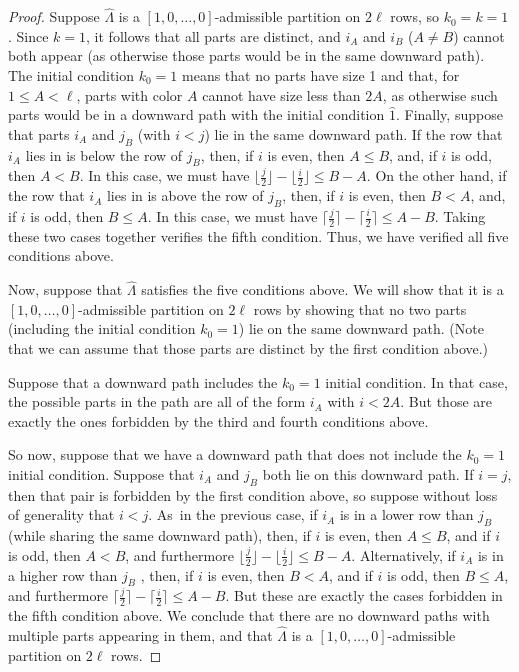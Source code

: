 \documentclass[pdftex]{sigma}
\numberwithin{equation}{section}
\theoremstyle{definition}
\newcommand{\ficone}{{\widehat{1}}}
\newcommand{\LH}{{\widehat{\Lambda}}}
\begin{document}
\begin{proof}
Suppose $\LH$ is a $[1,0,\dots,0]$-admissible partition on $2\ell$ rows, so $k_0=k=1$. Since $k=1$, it follows that all parts are distinct, and $i_A$ and $i_B$ ($A\ne B$) cannot both appear (as otherwise those parts would be in the same downward path). The initial condition $k_0=1$ means that no parts have size 1 and that, for $1\le A < \ell$, parts with color $A$ cannot have size less than $2A$, as otherwise such parts would be in a downward path with the initial condition $\ficone$.
Finally, suppose that parts $i_A$ and $j_B$ (with $i<j$) lie in the same downward path. If the row that $i_A$ lies in is below the row of $j_B$, then, if $i$ is even, then $A \le B$, and, if $i$ is odd, then $A < B$. In this case, we must have $ \bigl\lfloor\frac j2\bigr\rfloor-\bigl\lfloor\frac i2\bigl\rfloor\le B-A$. On the other hand, if the row that $i_A$ lies in is above the row of $j_B$, then, if $i$ is even, then $B<A$, and, if $i$ is odd, then $B \le A$. In this case, we must have $ \bigl\lceil\frac j2\bigr\rceil-\bigl\lceil\frac i2\bigr\rceil\le A-B$. Taking these two cases together verifies the fifth condition. Thus, we have verified all five conditions above.

Now, suppose that $\LH$ satisfies the five conditions above. We will show that it is a $[1,0,\dots,0]$-admissible partition on $2\ell$ rows by showing that no two parts (including the initial condition $k_0=1$) lie on the same downward path. (Note that we can assume that those parts are distinct by the first condition above.)

Suppose that a downward path includes the $k_0=1$ initial condition. In that case, the possible parts in the path are all of the form $i_A$ with $i< 2A$. But those are exactly the ones forbidden by the third and fourth conditions above.

So now, suppose that we have a downward path that does not include the $k_0=1$ initial condition. Suppose that $i_A$ and $j_B$ both lie on this downward path. If $i=j$, then that pair is forbidden by the first condition above, so suppose without loss of generality that $i<j$. As~in the previous case, if $i_A$ is in a lower row than $j_B$ (while sharing the same downward path), then, if $i$ is even, then $A \le B$, and if $i$ is odd, then $A<B$, and furthermore $ \bigl\lfloor\frac j2\bigr\rfloor-\bigl\lfloor\frac i2\bigr\rfloor\le B-A$. Alternatively, if $i_A$ is in a higher row than $j_B$ , then, if $i$ is even, then $B<A$, and if $i$ is odd, then $B \le A$, and furthermore
$ \bigl\lceil\frac j2\bigr\rceil-\bigl\lceil\frac i2\bigr\rceil\le A-B$. But these are exactly the cases forbidden in the fifth condition above. We conclude that there are no downward paths with multiple parts appearing in them, and that $\LH$ is a $[1,0,\dots,0]$-admissible partition on $2\ell$ rows.
\end{proof}
\end{document}
